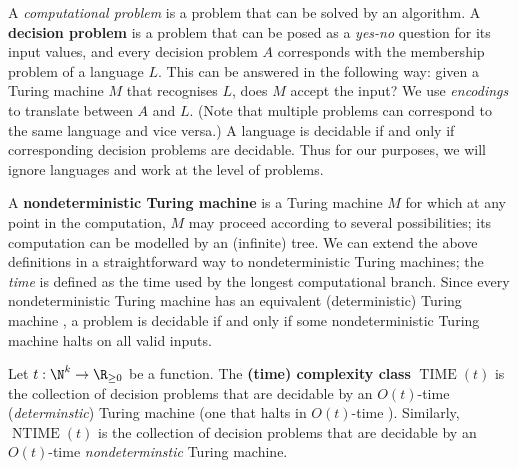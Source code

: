 A \textit{computational problem} is a problem that can be solved by an algorithm. A \textbf{decision problem} is a problem that can be posed as a \textit{yes-no} question for its input values, and every decision problem $A$ corresponds with the membership problem of a language $L$. This can be answered in the following way: given a Turing machine $M$ that recognises $L$, does $M$ accept the input? We use \textit{encodings} to translate between $A$ and $L$. (Note that multiple problems can correspond to the same language and vice versa.) A language is decidable if and only if corresponding decision problems are decidable. Thus for our purposes, we will ignore languages and work at the level of problems.

A \textbf{nondeterministic Turing machine} is a Turing machine $M$ for which at any point in the computation, $M$ may proceed according to several possibilities; its computation can be modelled by an (infinite) tree. We can extend the above definitions in a straightforward way to nondeterministic Turing machines; the \textit{time}  is defined  as the time used by the longest computational branch. Since every nondeterministic Turing machine has an equivalent (deterministic) Turing machine , a problem is decidable if and only if some nondeterministic Turing machine halts on all valid inputs.

\begin{definition}\label{def:time_complexity_class}
    Let $t : \N^k \to \R_{\geq 0}$ be a function. The \textbf{(time) complexity class} $\operatorname{TIME}(t)$ is the collection of decision problems that are decidable by an $O(t)$-time (\textit{determinstic}) Turing machine (one that halts in $O(t)$-time ). Similarly, $\operatorname{NTIME}(t)$ is the collection of decision problems that are decidable by an $O(t)$-time \textit{nondeterminstic} Turing machine.

\end{definition}

